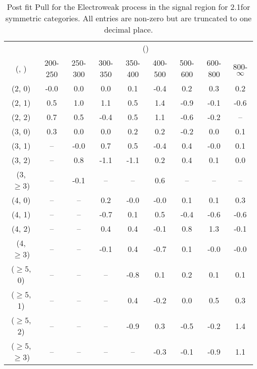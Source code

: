 \begin{table}[h!]
\tiny
\centering
\caption{Post fit Pull for the Electroweak process in the signal region for 2.1\ifb for symmetric categories. All entries are non-zero but are truncated to one decimal place.\label{tab:pullseppost_sig_ewk_sym}}
\begin{tabular}
{ccccccccc}
	\hline\hline
	& \multicolumn{8}{c}{\scalht (\gev)} \\ 
	 (\njet,  \nb) & 200-250 & 250-300 & 300-350 & 350-400 & 400-500 & 500-600 & 600-800 & 800-$\infty$ \\ [0.8ex] 
\hline
	(2, 0) & -0.0 & 0.0 & 0.0 & 0.1 & -0.4 & 0.2 & 0.3 & 0.2 \\[0.5ex] 
	(2, 1) & 0.5 & 1.0 & 1.1 & 0.5 & 1.4 & -0.9 & -0.1 & -0.6 \\[0.5ex] 
	(2, 2) & 0.7 & 0.5 & -0.4 & 0.5 & 1.1 & -0.6 & -0.2 & -- \\[0.5ex] 
	(3, 0) & 0.3 & 0.0 & 0.0 & 0.2 & 0.2 & -0.2 & 0.0 & 0.1 \\[0.5ex] 
	(3, 1) & -- & -0.0 & 0.7 & 0.5 & -0.4 & 0.4 & -0.0 & 0.1 \\[0.5ex] 
	(3, 2) & -- & 0.8 & -1.1 & -1.1 & 0.2 & 0.4 & 0.1 & 0.0 \\[0.5ex] 
	(3, $\ge3$) & -- & -0.1 & -- & -- & 0.6 & -- & -- & -- \\[0.5ex] 
	(4, 0) & -- & -- & 0.2 & -0.0 & -0.0 & 0.1 & 0.1 & 0.3 \\[0.5ex] 
	(4, 1) & -- & -- & -0.7 & 0.1 & 0.5 & -0.4 & -0.6 & -0.6 \\[0.5ex] 
	(4, 2) & -- & -- & 0.4 & 0.4 & -0.1 & 0.8 & 1.3 & -0.1 \\[0.5ex] 
	(4, $\ge3$) & -- & -- & -0.1 & 0.4 & -0.7 & 0.1 & -0.0 & -0.0 \\[0.5ex] 
	($\ge5$, 0) & -- & -- & -- & -0.8 & 0.1 & 0.2 & 0.1 & 0.1 \\[0.5ex] 
	($\ge5$, 1) & -- & -- & -- & 0.4 & -0.2 & 0.0 & 0.5 & 0.3 \\[0.5ex] 
	($\ge5$, 2) & -- & -- & -- & -0.9 & 0.3 & -0.5 & -0.2 & 1.4 \\[0.5ex] 
	($\ge5$, $\ge3$) & -- & -- & -- & -- & -0.3 & -0.1 & -0.9 & 1.1 \\[0.5ex] 
	\hline
	\hline
\end{tabular}
\end{table}
